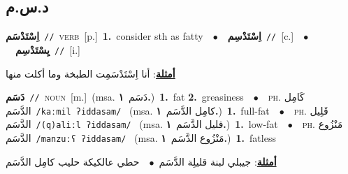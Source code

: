 \documentclass[10pt,a4paper,twoside]{article} %
\begin{document}
\begin{multicols}{2}
\vspace{-3mm}
\subsection*{\color{blue}\foreignlanguage{arabic}{د.س.م}\color{blue}{}} 

{\setlength\topsep{0pt}\textbf{\foreignlanguage{arabic}{اِسْتَدْسَم}}\ {\color{gray}\texttt{//}\color{black}}\ \textsc{verb}\ [p.]\ \textbf{1.}~consider sth as fatty\ \ $\bullet$\ \ \setlength\topsep{0pt}\textbf{\foreignlanguage{arabic}{اِسْتَدْسِم}}\ {\color{gray}\texttt{//}\color{black}}\ [c.]\ \ $\bullet$\ \ \setlength\topsep{0pt}\textbf{\foreignlanguage{arabic}{يِسْتَدْسِم}}\ {\color{gray}\texttt{//}\color{black}}\ [i.]\  \begin{flushright}\color{gray}\foreignlanguage{arabic}{\textbf{\underline{\foreignlanguage{arabic}{أمثلة}}}: أنا اِسْتَدْسَمِت الطبخة وما أكلت منها}\end{flushright}\color{black}} \vspace{2mm}

{\setlength\topsep{0pt}\textbf{\foreignlanguage{arabic}{دَسَم}}\ {\color{gray}\texttt{//}\color{black}}\ \textsc{noun}\ [m.]\ \color{gray}(msa. \foreignlanguage{arabic}{دَسَم}~\foreignlanguage{arabic}{\textbf{١.}})\color{black}\ \textbf{1.}~fat  \textbf{2.}~greasiness\ \ $\bullet$\ \ \textsc{ph.} \color{gray} \foreignlanguage{arabic}{كَامِل الدَّسَم}\color{black}\ {\color{gray}\texttt{/{\sffamily kaːmil ʔiddasam}/}\color{black}}\ \color{gray} (msa. \foreignlanguage{arabic}{كامِل الدَّسَم}~\foreignlanguage{arabic}{\textbf{١.}})\color{black}\ \textbf{1.}~full-fat\ \ $\bullet$\ \ \textsc{ph.} \color{gray} \foreignlanguage{arabic}{قَلِيل الدَّسَم}\color{black}\ {\color{gray}\texttt{/{\sffamily (q)aliːl ʔiddasam}/}\color{black}}\ \color{gray} (msa. \foreignlanguage{arabic}{قليل الدَّسَم}~\foreignlanguage{arabic}{\textbf{١.}})\color{black}\ \textbf{1.}~low-fat\ \ $\bullet$\ \ \textsc{ph.} \color{gray} \foreignlanguage{arabic}{مَنْزُوع الدَّسَم}\color{black}\ {\color{gray}\texttt{/{\sffamily manzuːʕ ʔiddasam}/}\color{black}}\ \color{gray} (msa. \foreignlanguage{arabic}{مَنْزُوع الدَّسَم}~\foreignlanguage{arabic}{\textbf{١.}})\color{black}\ \textbf{1.}~fatless\  \begin{flushright}\color{gray}\foreignlanguage{arabic}{\textbf{\underline{\foreignlanguage{arabic}{أمثلة}}}: جيبلي لبنة قليلِة الدَّسَم\ $\bullet$\ \  حطي عالكيكة حليب كامِل الدَّسَم}\end{flushright}\color{black}} \vspace{2mm}


\end{multicols}
\end{document}
